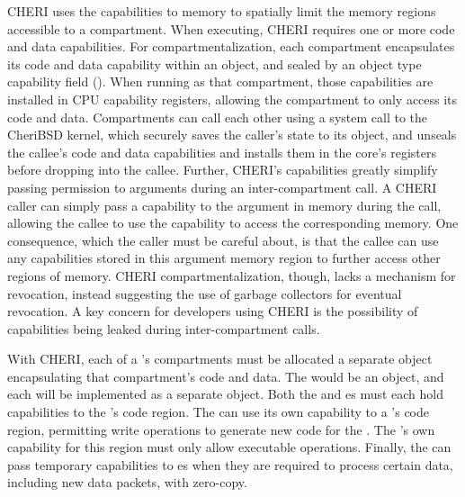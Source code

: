 CHERI uses the capabilities to memory to spatially limit the memory regions
accessible to a compartment.
When executing, CHERI requires one or more code and data capabilities. 
For compartmentalization, each compartment encapsulates its code and data
capability within an object, and sealed by an object type capability 
field (). 
When running as that compartment, those capabilities are installed in CPU
capability registers, allowing the compartment to only access its code and data.
Compartments can call each other using a system call to the CheriBSD kernel,
which securely saves the caller's state to its object, and unseals the
callee's code and data capabilities and installs them in the core's registers 
before dropping into the callee.
Further, CHERI's capabilities greatly simplify passing permission to arguments
during an inter-compartment call.
A CHERI caller can simply pass a capability to the argument in memory during
the call, allowing the callee to use the capability to access the corresponding
memory.
One consequence, which the caller must be careful about, is that the callee can
use any capabilities stored in this argument memory region to further access other
regions of memory.
CHERI compartmentalization, though, lacks a mechanism for revocation,
instead suggesting the use of garbage collectors for eventual revocation.
A key concern for developers using CHERI is the possibility of capabilities
being leaked during inter-compartment calls.

With CHERI, each of a \browser's compartments must be allocated a separate
object encapsulating that compartment's code and data.
The \renderer would be an object, and each \sandbox will be implemented as
a separate object.
Both the \renderer and \sandbox{}es must each hold capabilities to the
\sandbox's code region.
The \renderer can use its own capability to a \sandbox's code region,
permitting write operations to generate new code for the \sandbox.
The \sandbox's own capability for this region must only allow executable 
operations.
Finally, the \renderer can pass temporary capabilities to \sandbox{}es
when they are required to process certain data, including new data packets,
with zero-copy.

